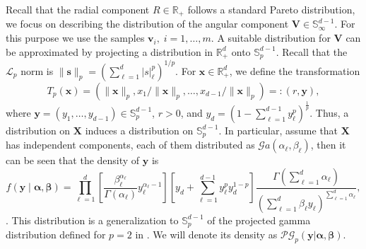 Recall that the radial component $R \in {\mathbb R}_+$ follows a standard 
    Pareto distribution, we focus on describing the distribution of the angular 
    component $\bm{V}\in {\mathbb S}_{\infty}^{d-1}$. For this purpose we use 
    the samples $\bm{v}_i ,\; i=1, \ldots ,m$. A suitable distribution for 
    $\bm{V}$ can be approximated by projecting a distribution in 
    $\mathbb{R}_+^d$ onto $\mathbb{S}_{p}^{d-1}$. Recall that the 
    $\mathcal{L}_p$ norm is 
    $\lVert \bm{s} \rVert_p = (\sum_{\ell = 1}^d \rvert s\lvert_{\ell}^p)^{1/p}$. 
    For $\bm{x} \in\mathbb{R}_+^d$, we define the transformation 
    \[
        T_p(\bm{x}) = (\lVert\bm{x}\rVert_p, x_1/\lVert\bm{x}\rVert_p, \ldots, 
        x_{d-1}/\lVert\bm{x}\rVert_p)=: (r,\bm{y}),
    \] where
    $\bm{y} = (y_1, \ldots , y_{d-1}) \in \mathbb{S}_{p}^{d-1}$, $r>0$, and 
    $y_d = \left(1 - \sum_{\ell = 1}^{d-1}y_\ell^p\right)^{\frac{1}{p}}$.
    Thus, a distribution on $\bm{X}$ induces a distribution on 
    $\mathbb{S}_{p}^{d-1}$. In particular, assume that $\bm{X}$ has independent 
    components, each of them distributed as 
    $\mathcal{G}a(\alpha_{\ell}, \beta_{\ell})$, then it can be seen that the 
    density of $\bm{y}$ is
    \begin{equation}
        \label{eqn:projgamma}
        f(\bm{ y}\mid\bm{ \alpha},\bm{ \beta}) =
            \prod_{\ell = 1}^d\left[
                \frac{\beta_{\ell}^{\alpha_{\ell}}}{\Gamma(\alpha_{\ell})}
                y_{\ell}^{\alpha_{\ell} - 1}
                \right]
            \left[y_d +
                {\textstyle \sum}_{\ell = 1}^{d-1}y_{\ell}^py_d^{1 - p}
                \right]
            \frac{\Gamma({\textstyle\sum}_{\ell = 1}^d\alpha_{\ell})}{
                    \left({\textstyle\sum}_{\ell = 1}^d
                \beta_{\ell}y_{\ell}\right)^{
                    {\scriptstyle\sum_{\ell = 1}^d \alpha_{\ell}}}
                },
  \end{equation}
    \citep[see,][for details]{trubey:pg}. This distribution is a generalization 
    to $\mathbb{S}_{p}^{d-1}$ of the projected gamma distribution defined for 
    $p=2$ in \cite{nunez2019}. We will denote its density as 
    $\mathcal{PG}_p(\bm{y}|\bm{\alpha},\bm{\beta})$.

